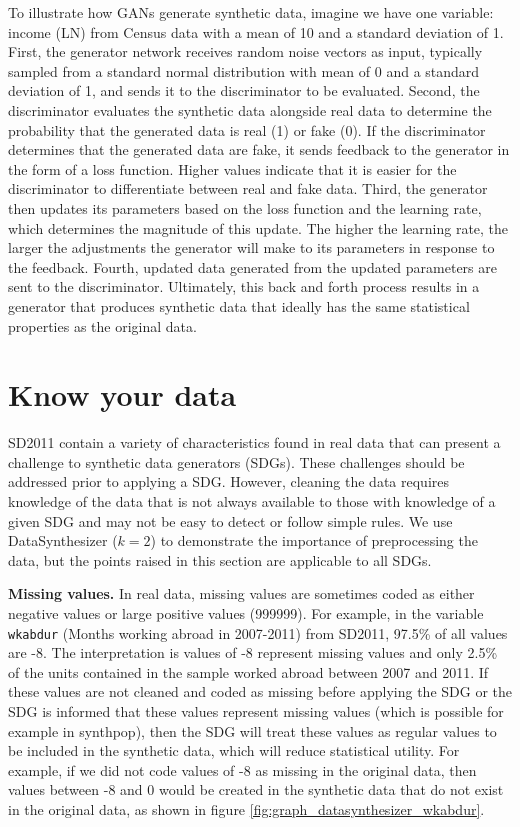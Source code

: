 \documentclass[runningheads]{llncs}
\begin{document}
To illustrate how GANs generate synthetic data, imagine we have one variable: income (LN) from Census data with a mean of 10 and a standard deviation of 1.  First, the generator network receives random noise vectors as input, typically sampled from a standard normal distribution with mean of 0 and a standard deviation of 1, and sends it to the discriminator to be evaluated.  Second, the discriminator evaluates the synthetic data alongside real data to determine the probability that the generated data is real (1) or fake (0).  If the discriminator determines that the generated data are fake, it sends feedback to the generator in the form of a loss function.  Higher values indicate that it is easier for the discriminator to differentiate between real and fake data.  Third, the generator then updates its parameters based on the loss function and the learning rate, which determines the magnitude of this update.  The higher the learning rate, the larger the adjustments the generator will make to its parameters in response to the feedback.  Fourth,  updated data generated from the updated parameters are sent to the discriminator.  Ultimately, this back and forth process results in a generator that produces synthetic data that ideally has the same statistical properties as the original data.  


\section{Know your data}\label{sec:know_your_data}

SD2011 contain a variety of characteristics found in real data that can present a challenge to synthetic data generators (SDGs). These challenges should be addressed prior to applying a SDG.  However, cleaning the data requires knowledge of the data that is not always available to those with knowledge of a given SDG and may not be easy to detect or follow simple rules.  We use DataSynthesizer ($k=2$) to demonstrate the importance of preprocessing the data, but the points raised in this section are applicable to all SDGs.

{\bf Missing values.} In real data, missing values are sometimes coded as either negative values or large positive values (999999).  For example, in the variable \texttt{wkabdur} (Months working abroad in 2007-2011) from SD2011, 97.5\% of all values are -8.  The interpretation is values of -8 represent missing values and only 2.5\% of the units contained in the sample worked abroad between 2007 and 2011.  If these values are not cleaned and coded as missing before applying the SDG or the SDG is informed that these values represent missing values (which is possible for example in synthpop), then the SDG will treat these values as regular values to be included in the synthetic data, which will reduce statistical utility.  For example, if we did not code values of -8 as missing in the original data, then values between -8 and 0 would be created in the synthetic data that do not exist in the original data, as shown in figure \ref{fig:graph_datasynthesizer_wkabdur}.  
\end{document}

